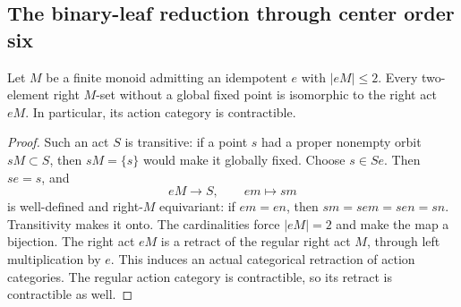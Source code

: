 \subsection{The binary-leaf reduction through center order six}

\begin{lemma}
\label{CP2:A-binary-act-two-element-right-ideal}
Let $M$ be a finite monoid admitting an idempotent $e$ with
$|eM|\leq2$. Every two-element right $M$-set without a global
fixed point is isomorphic to the right act $eM$. In particular,
its action category is contractible.
\end{lemma}
\begin{proof}
Such an act $S$ is transitive: if a point $s$ had a proper
nonempty orbit $sM\subset S$, then $sM=\{s\}$ would make it
globally fixed. Choose $s\in Se$. Then $se=s$, and
\[
 eM\longrightarrow S,\qquad em\longmapsto sm
\]
is well-defined and right-$M$ equivariant: if $em=en$, then
$sm=sem=sen=sn$. Transitivity makes it onto. The cardinalities
force $|eM|=2$ and make the map a bijection. The right act $eM$
is a retract of the regular right act $M$, through left
multiplication by $e$. This induces an actual categorical
retraction of action categories. The regular action category
is contractible, so its retract is contractible as well.
\end{proof}


